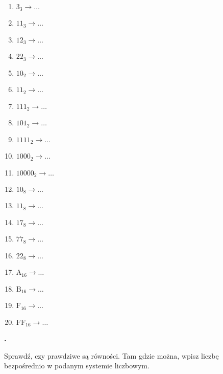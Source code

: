 \documentclass[a4paper]{article}
\begin{document}
\begin{multicols}{3}
\begin{enumerate}[label=\arabic*.]
    \item $3_{3}\rightarrow \dots$
    \item $11_{3}\rightarrow \dots$
    \item $12_{3}\rightarrow \dots$
    \item $22_{3}\rightarrow \dots$

    \item $10_{2}\rightarrow \dots$
    \item $11_{2}\rightarrow \dots$
    \item $111_{2}\rightarrow \dots$
    \item $101_{2}\rightarrow \dots$
    \item $1111_{2}\rightarrow \dots$
    \item $1000_{2}\rightarrow \dots$
    \item $10000_{2}\rightarrow \dots$

    \item $10_{8}\rightarrow \dots$
    \item $11_{8}\rightarrow \dots$
    \item $17_{8}\rightarrow \dots$
    \item $77_{8}\rightarrow \dots$
    \item $22_{8}\rightarrow \dots$

    \item $\mathrm{A_{16}}\rightarrow \dots$
    \item $\mathrm{B_{16}}\rightarrow \dots$
    \item $\mathrm{F_{16}}\rightarrow \dots$
    \item $\mathrm{FF_{16}}\rightarrow \dots$

\end{enumerate}
\end{multicols}

\textbf{.}\addtocounter{zadanie}{1} Sprawdź, czy prawdziwe są równości. Tam gdzie można, wpisz liczbę bezpośrednio w podanym systemie liczbowym.
\end{document}
